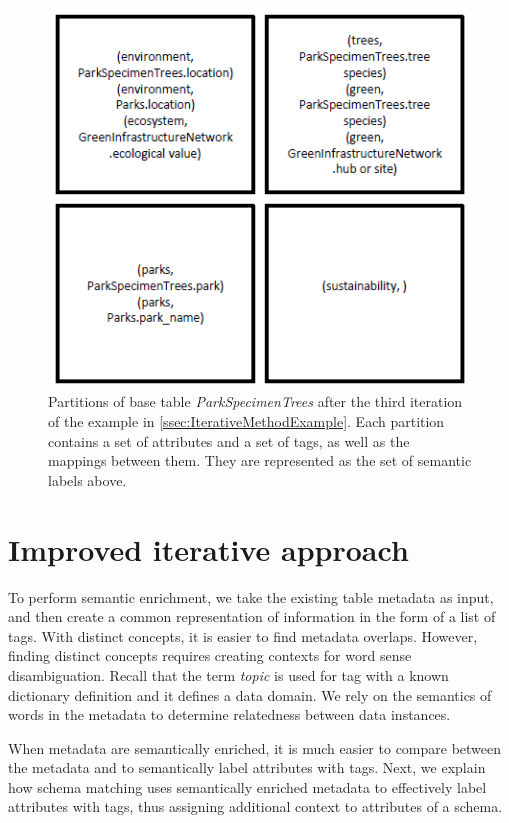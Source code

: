 \begin{figure}
    \centering
    \includegraphics[width=5in]{figures/partitions-park-specimen-trees.png}
    \caption{Partitions of base table \textit{ParkSpecimenTrees} after the third iteration of the example in \autoref{ssec:IterativeMethodExample}. Each partition contains a set of attributes and a set of tags, as well as the mappings between them. They are represented as the set of semantic labels above.}
    \label{fig:partitions-park-specimen-trees}
\end{figure}

\section{Improved iterative approach}
\label{sec:ImprovedIterativeApproach}

To perform semantic enrichment, we take the existing table metadata as input, and then create a common representation of information in the form of a list of tags.
With distinct concepts, it is easier to find metadata overlaps.
However, finding distinct concepts requires creating contexts for word sense disambiguation.
Recall that the term \textit{topic} is used for tag with a known dictionary definition and it defines a data domain.
We rely on the semantics of words in the metadata to determine relatedness between data instances.

When metadata are semantically enriched, it is much easier to compare between the metadata and to semantically label attributes with tags. Next, we explain how schema matching uses semantically enriched metadata to effectively label attributes with tags, thus assigning additional context to attributes of a schema.

